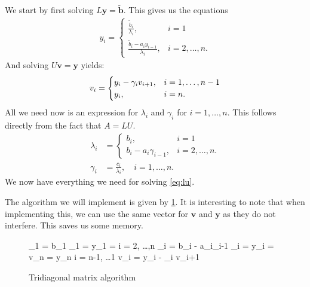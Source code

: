 \documentclass[10pt,a4paper]{amsart}
\begin{document}
  We start by first solving $L\mathbf y = \mathbf{\tilde b}$. This gives us the
  equations
  \begin{align*}
    \label{eq:y}
    y_i = \begin{cases}
      \frac{\tilde b_i}{\lambda_i}, & i = 1 \\
      \frac{\tilde b_i - a_iy_{i-1}}{\lambda_i}, & i = 2, \ldots, n.
    \end{cases}
  \end{align*}
  And solving $U\mathbf v = \mathbf y$ yields:
  \begin{equation}
    \notag
    v_i = \begin{cases}
      y_i - \gamma_iv_{i+1}, & i = 1,\ldots, n-1 \\
      y_i, & i = n.
    \end{cases}
  \end{equation}
  All we need now is an expression for $\lambda_i$ and $\gamma_i$ for $i = 1,
  \ldots, n$. This follows directly from the fact that $A = LU$.
  \begin{align*}
    \lambda_i &= \begin{cases}
      b_i, & i = 1 \\
      b_i - a_i\gamma_{i-1}, & i = 2, \ldots, n.
    \end{cases} \\
    \gamma_i &= \frac{c_i}{\lambda_i}, \quad i = 1, \ldots, n.
  \end{align*}
  We now have everything we need for solving \cref{eq:lu}.
  
  The algorithm we will implement is given by \cref{fig:tdma}. It is interesting to note
  that when implementing this, we can use the same vector for $\mathbf v$ and
  $\mathbf y$ as they do not interfere. This saves us some memory.
  \begin{figure}[h]
    \centering
    \caption{Tridiagonal matrix algorithm}
    \begin{program}
      \lambda_1 = b_1
      \gamma_1 = 
      y_1 = 
      \FOR i = 2, \ldots,n \DO
      \lambda_i = b_i - a_i\gamma_{i-1}
      \gamma_i = 
      y_i = 
      \OD
      v_n = y_n
      \FOR i = n-1, \ldots 1 \DO
        v_i = y_i - \gamma_i v_{i+1}
      \OD
    \end{program}
    \label{fig:tdma}
  \end{figure}
  
\end{document}
